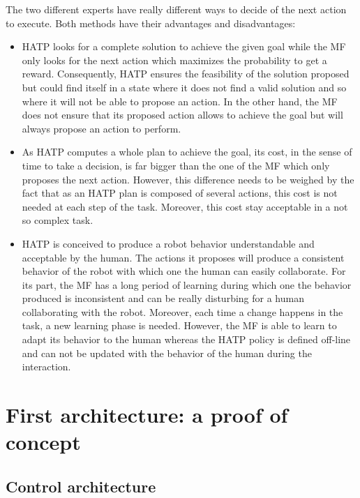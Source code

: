 \documentclass[english,a4paper,11pt,twoside]{StyleThese}
\begin{document}
The two different experts have really different ways to decide of the next action to execute. Both methods have their advantages and disadvantages:
\begin{itemize}
\item HATP looks for a complete solution to achieve the given goal while the MF only looks for the next action which maximizes the probability to get a reward. Consequently, HATP ensures the feasibility of the solution proposed but could find itself in a state where it does not find a valid solution and so where it will not be able to propose an action. In the other hand, the MF does not ensure that its proposed action allows to achieve the goal but will always propose an action to perform.
\item As HATP computes a whole plan to achieve the goal, its cost, in the sense of time to take a decision, is far bigger than the one of the MF which only proposes the next action. However, this difference needs to be weighed by the fact that as an HATP plan is composed of several actions, this cost is not needed at each step of the task. Moreover, this cost stay acceptable in a not so complex task.
\item HATP is conceived to produce a robot behavior understandable and acceptable by the human. The actions it proposes will produce a consistent behavior of the robot with which one the human can easily collaborate. For its part, the MF has a long period of learning during which one the behavior produced is inconsistent and can be really disturbing for a human collaborating with the robot. Moreover, each time a change happens in the task, a new learning phase is needed. However, the MF is able to learn to adapt its behavior to the human whereas the HATP policy is defined off-line and can not be updated with the behavior of the human during the interaction.
\end{itemize}


\section{First architecture: a proof of concept}


\subsection{Control architecture}
\end{document}
